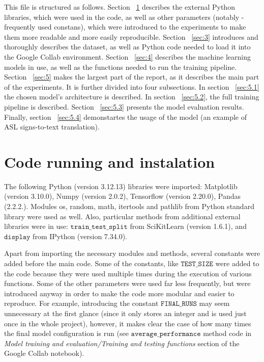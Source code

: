 \documentclass{article}
\newcommand{\code}[1]{\texttt{#1}} %
\begin{document}
This file is structured as follows. Section ~\ref{sec:2} describes the external Python libraries, which were used in the code, as well as other 
parameters (notably - frequently used constans), which were introduced to the experiments to make them more readable and more easily reproducible. 
Section ~\ref{sec:3} introduces and thoroughly describes the dataset, as well as Python code needed to load it into the Google Collab environment. 
Section ~\ref{sec:4} describes the machine learning models in use, as well as the functions needed to run the training pipeline. Section ~\ref{sec:5} makes the largest 
part of the report, as it describes the main part of the experiments. It is further divided into four subsections. In section ~\ref{sec:5.1} the chosen model's
architecture is described. In section ~\ref{sec:5.2}, the full training pipeline is described. Section ~\ref{sec:5.3} presents the model evaluation results. 
Finally, section ~\ref{sec:5.4} demonstartes the usage of the model (an example of ASL signs-to-text translation).

\section{Code running and instalation}
\label{sec:2}
The following Python (version 3.12.13) libraries were imported: Matplotlib (version 3.10.0), Numpy (version 2.0.2), Tensorflow (version 2.20.0), 
Pandas (2.2.2.). Modules os, random, math, itertools and pathlib from Python standard library were used as well. Also, particular methods from 
additional external libraries were in use: $\code{train\_test\_split}$ from SciKitLearn (version 1.6.1), and $\code{display}$ from IPython 
(version 7.34.0).  

Apart from importing the necessary modules and methods, several constants were added before the main code. Some of the constants, like $\code{TEST\_SIZE}$ 
were added to the code because they were used multiple times during the execution of various functions. Some of the other parameters were used 
far less frequently, but were introduced anyway in order to make the code more modular and easier to reproduce.
For example, introducing the constant $\code{FINAL\_RUNS}$ may seem unnecessary at the first glance (since it only stores an integer
and is used just once in the whole project), however, it makes clear the case of how many times the final model configuration is run (see 
$\code{average\_performance}$ method code in \textit{Model training and evaluation/Training and testing functions} section of the Google 
Collab notebook).
\end{document}
